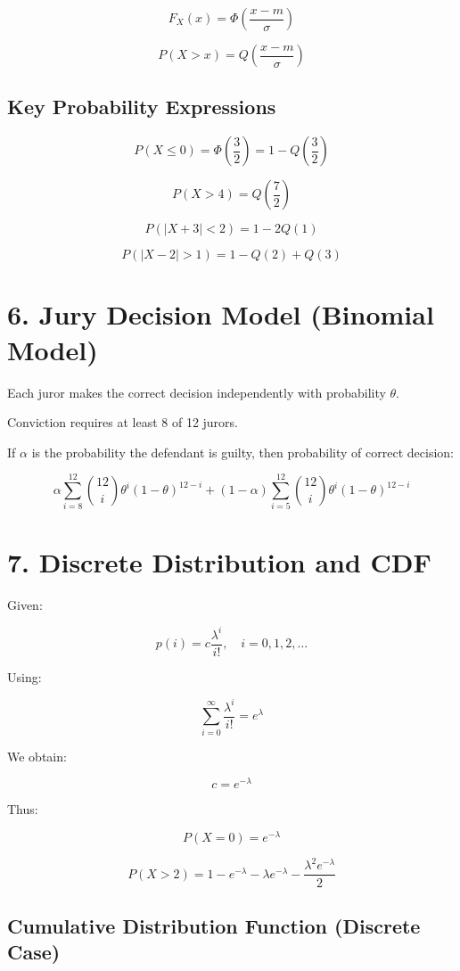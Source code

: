\documentclass[12pt]{article}
\begin{document}
\[
F_X(x)=\Phi\left(\frac{x-m}{\sigma}\right)
\]

\[
P(X>x)=Q\left(\frac{x-m}{\sigma}\right)
\]

\subsection*{Key Probability Expressions}

\[
P(X \le 0)=\Phi\left(\frac{3}{2}\right)
=1-Q\left(\frac{3}{2}\right)
\]

\[
P(X>4)=Q\left(\frac{7}{2}\right)
\]

\[
P(|X+3|<2)=1-2Q(1)
\]

\[
P(|X-2|>1)=1-Q(2)+Q(3)
\]

\section*{6. Jury Decision Model (Binomial Model)}

Each juror makes the correct decision independently with probability $\theta$.

Conviction requires at least 8 of 12 jurors.

If $\alpha$ is the probability the defendant is guilty, then probability of correct decision:

\[
\alpha \sum_{i=8}^{12} 
\binom{12}{i}\theta^i(1-\theta)^{12-i}
+
(1-\alpha)
\sum_{i=5}^{12}
\binom{12}{i}\theta^i(1-\theta)^{12-i}
\]

\section*{7. Discrete Distribution and CDF}

Given:

\[
p(i)=c\frac{\lambda^i}{i!}, 
\quad i=0,1,2,\dots
\]

Using:

\[
\sum_{i=0}^{\infty}
\frac{\lambda^i}{i!}=e^\lambda
\]

We obtain:

\[
c=e^{-\lambda}
\]

Thus:

\[
P(X=0)=e^{-\lambda}
\]

\[
P(X>2)=
1-e^{-\lambda}
-\lambda e^{-\lambda}
-\frac{\lambda^2 e^{-\lambda}}{2}
\]

\subsection*{Cumulative Distribution Function (Discrete Case)}
\end{document}
